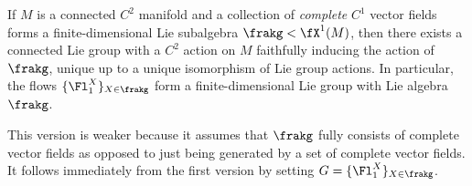 \begin{thm}\label{thm Lie-Palais}
    If $M$ is a connected $C^2$ manifold and a collection of \emph{complete} $C^1$ vector fields forms a finite-dimensional Lie subalgebra $\frakg<\fX^1(M)$, then there exists a connected Lie group with a $C^2$ action on $M$ faithfully inducing the action of $\frakg$, unique up to a unique isomorphism of Lie group actions. In particular, the flows $\{\Fl^{X}_1\}_{X\in \frakg}$ form a finite-dimensional Lie group with Lie algebra $\frakg$.
\end{thm}

This version is weaker because it assumes that $\frakg$ fully consists of complete vector fields as opposed to just being generated by a set of complete vector fields. It follows immediately from the first version by setting $G=\{\Fl_1^X\}_{X\in\frakg}$.

